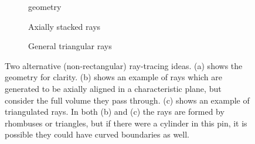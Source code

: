 {{{{        \begin{figure}[h]
          \centering
          \begin{subfigure}[t]{0.32\textwidth}
            \centering
            \def\svgwidth{0.85\linewidth}
            
            \caption{geometry\label{fig:MR:Alternatives:Geom}}
          \end{subfigure}%
          \begin{subfigure}[t]{0.32\textwidth}
            \centering
            \def\svgwidth{0.85\linewidth}
            
            \caption{Axially stacked rays\label{fig:MR:Alternative 1}}
          \end{subfigure}%
          \begin{subfigure}[t]{0.32\textwidth}
            \centering
            \def\svgwidth{0.85\linewidth}
            
            \caption{General triangular rays\label{fig:MR:Alternative 2}}
          \end{subfigure}
          \caption{
            Two alternative (non-rectangular) ray-tracing ideas.
            (a) shows the geometry for clarity.
            (b) shows an example of rays which are generated to be axially aligned in a characteristic plane, but consider the full volume they pass through.
            (c) shows an example of triangulated rays.
            In both (b) and (c) the rays are formed by rhombuses or triangles, but if there were a cylinder in this pin, it is possible they could have curved boundaries as well.
          }
          \label{figs:MR:Alternatives}
        \end{figure}
      }
    }
  }


}
